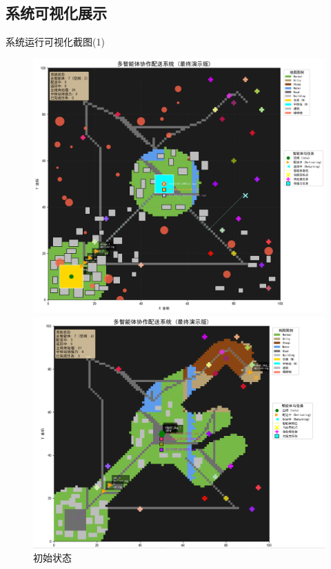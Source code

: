 \documentclass[
10pt,
aspectratio=169,
]{beamer}
\begin{document}
\subsection{系统可视化展示}
\begin{frame}{系统运行可视化截图(1)}
    \begin{figure}
        \centering
        \begin{minipage}[t]{0.3\textwidth}
            \centering
            \includegraphics[width=\textwidth]{visualization_snapshots/1.png}
            \caption{初始状态}
        \end{minipage}
        \hfill
        \begin{minipage}[t]{0.3\textwidth}
            \centering
            \includegraphics[width=\textwidth]{visualization_snapshots/2.png}

\end{minipage}
\end{figure}
\end{frame}
\end{document}

